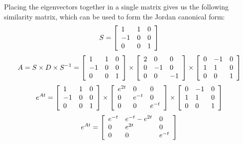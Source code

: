 \documentclass[12pt,letterpaper,reqno]{amsart}
\begin{document}
\begin{enumerate}
\begin{enumerate}
    Placing the eigenvectors together in a single matrix gives us the following similarity matrix, which can be used to form the Jordan canonical form:
    $$S = \left[ \begin{array} { l l l } { 1 } & { 1 } & { 0 } \\ { -1 } & { 0 } & { 0 } \\ { 0 } & { 0 } & { 1 } \end{array} \right]$$
    $$A = S\times D\times S^{-1} = \left[ \begin{array} { l l l } { 1 } & { 1 } & { 0 } \\ { -1 } & { 0 } & { 0 } \\ { 0 } & { 0 } & { 1 } \end{array} \right] \times \left[ \begin{array} { l l l } { 2 } & { 0 } & { 0 } \\ { 0 } & { -1 } & { 0 } \\ { 0 } & { 0 } & { -1 } \end{array} \right] \times \left[ \begin{array} { l l l } { 0 } & { -1 } & { 0 } \\ { 1 } & { 1 } & { 0 } \\ { 0 } & { 0 } & { 1 } \end{array} \right]$$
    $$e^{A t} = \left[ \begin{array} { l l l } { 1 } & { 1 } & { 0 } \\ { -1 } & { 0 } & { 0 } \\ { 0 } & { 0 } & { 1 } \end{array} \right] \times \left[ \begin{array} { l l l } { e^{2t} } & { 0 } & { 0 } \\ { 0 } & { e^{-t}} & { 0 } \\ { 0 } & { 0 } & { e^{-t}} \end{array} \right] \times \left[ \begin{array} { l l l } { 0 } & { -1 } & { 0 } \\ { 1 } & { 1 } & { 0 } \\ { 0 } & { 0 } & { 1 } \end{array} \right]$$
    $$e^{A t} = \left[ \begin{array} { l l l } { e^{-t} } & { e^{-t}-e^{2t} } & { 0 } \\ { 0 } & { e^{2t} } & { 0 } \\ { 0 } & { 0 } & { e^{-t} } \end{array} \right]$$
    \newline

\end{enumerate}
\end{enumerate}
\end{document}
